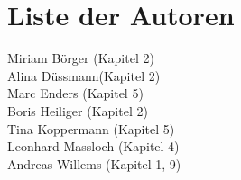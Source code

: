 \chapter*{Liste der Autoren}
Miriam Börger (Kapitel 2)\\
Alina Düssmann(Kapitel 2)\\
Marc Enders (Kapitel 5)\\
Boris Heiliger (Kapitel 2)\\
Tina Koppermann (Kapitel 5)\\
Leonhard Massloch (Kapitel 4)\\
Andreas Willems (Kapitel 1, 9)
